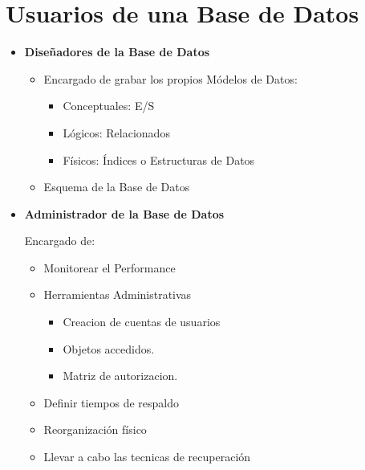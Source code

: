 \documentclass[12pt, fleqn]{report}                             %
\begin{document}
        \section{Usuarios de una Base de Datos}

            \begin{itemize}

                \item
                    \textbf{Diseñadores de la Base de Datos}

                    \begin{itemize}
                        \item Encargado de grabar los propios Módelos de Datos:
                        
                        \begin{itemize}
                            \item Conceptuales: E/S
                            \item Lógicos: Relacionados
                            \item Físicos: Índices o Estructuras de Datos
                        \end{itemize}

                        \item Esquema de la Base de Datos
                        
                    \end{itemize}


                \item
                    \textbf{Administrador de la Base de Datos}

                    Encargado de: 

                        \begin{itemize}
                            \item Monitorear el Performance
                            \item Herramientas Administrativas
                                \begin{itemize}
                                    \item Creacion de cuentas de usuarios
                                    \item Objetos accedidos.
                                    \item Matriz de autorizacion.
                                \end{itemize}
                            \item Definir tiempos de respaldo
                            \item Reorganización físico
                            \item Llevar a cabo las tecnicas de recuperación
                        \end{itemize}




\end{itemize}
\end{document}
